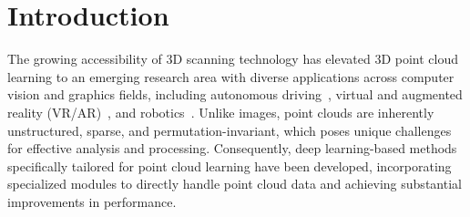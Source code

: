 \section{Introduction}
\label{sec:intro}



	The growing accessibility of 3D scanning technology has elevated 3D point cloud learning to an emerging research area with diverse applications across computer vision and graphics fields, including autonomous driving~\cite{yang2024visual,song2024graphbev,chen20203d}, virtual and augmented reality (VR/AR)~\cite{casado2023rendering,garrido2021point}, and robotics~\cite{wang2021trajectory,chen2022direct,christen2023learning}.  
	Unlike images, point clouds are inherently unstructured, sparse, and permutation-invariant, which poses unique challenges for effective analysis and processing. 
	Consequently, deep learning-based methods~\cite{qi2017pointnet, li2018pointcnn,qian2022pointnext,qi2017pointnet++,wang2019dynamic,wu2024point,wu2022point,zhang2022patchformer,park2022fast,zhao2021point,guo2021pct,ma2022rethinking} specifically tailored for point cloud learning have been developed, incorporating specialized modules to directly handle point cloud data and achieving substantial improvements in performance.

